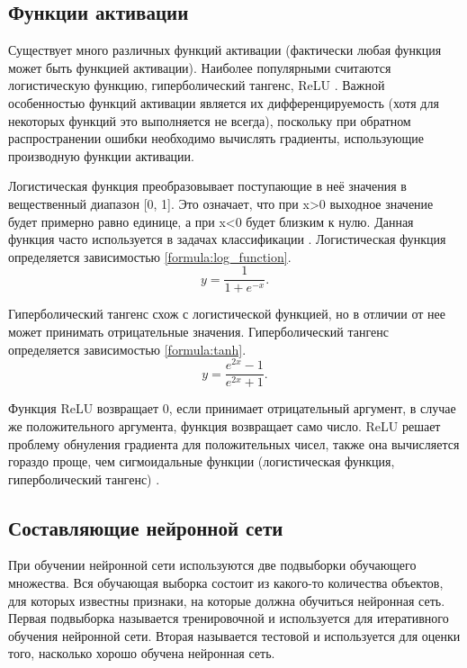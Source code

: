 \subsection{Функции активации}
Существует много различных функций активации (фактически любая функция может быть функцией активации). Наиболее популярными считаются логистическую функцию, гиперболический тангенс, ReLU \cite{activation_function}. Важной особенностью функций активации является их дифференцируемость (хотя для некоторых функций это выполняется не всегда), поскольку при обратном распространении ошибки необходимо вычислять градиенты, использующие производную функции активации.

Логистическая функция преобразовывает поступающие в неё значения в
вещественный диапазон [0, 1]. Это означает, что при x>0 выходное значение будет примерно равно единице, а при x<0 будет близким к нулю. Данная функция часто используется в задачах классификации \cite{activation_function}. Логистическая функция определяется зависимостью \ref{formula:log_function}.
\begin{equation}\label{formula:log_function}
y = \frac{1}{1 + e^{-x}}.
\end{equation}

Гиперболический тангенс схож с логистической функцией, но в отличии от нее может принимать отрицательные значения. Гиперболический тангенс определяется зависимостью \ref{formula:tanh}.
\begin{equation}\label{formula:tanh}
y = \frac{e^{2x} - 1}{e^{2x} + 1}.
\end{equation}

Функция ReLU возвращает 0, если принимает отрицательный
аргумент, в случае же положительного аргумента, функция возвращает само число. ReLU решает проблему обнуления градиента для положительных чисел, также она вычисляется гораздо проще, чем сигмоидальные функции (логистическая функция, гиперболический тангенс) \cite{activation_function}.

\subsection{Составляющие нейронной сети}
При обучении нейронной сети используются две подвыборки обучающего множества. Вся обучающая выборка состоит из какого-то количества объектов, для которых известны признаки, на которые должна обучиться нейронная сеть. Первая подвыборка называется тренировочной и используется для итеративного обучения нейронной сети. Вторая называется тестовой и используется для оценки того, насколько хорошо обучена нейронная сеть.

